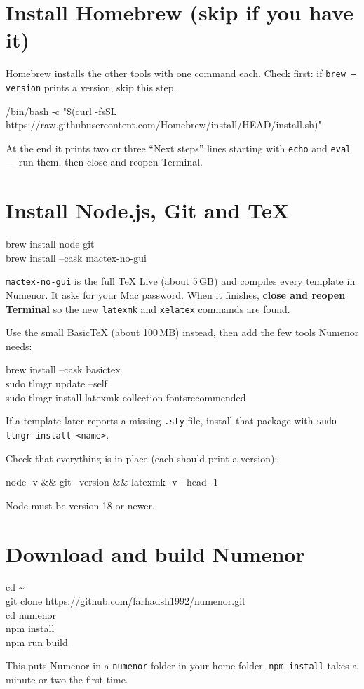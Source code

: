 \documentclass[11pt,a4paper]{article}
\begin{document}
\section{Install Homebrew (skip if you have it)}
Homebrew installs the other tools with one command each. Check first: if \texttt{brew --version} prints a version, skip this step.
\begin{term}
{\footnotesize /bin/bash -c "\$(curl -fsSL https://raw.githubusercontent.com/Homebrew/install/HEAD/install.sh)"}
\end{term}
At the end it prints two or three ``Next steps'' lines starting with \texttt{echo} and \texttt{eval} --- run them, then close and reopen Terminal.

\section{Install Node.js, Git and TeX}
\begin{term}
brew install node git\\
brew install --cask mactex-no-gui
\end{term}
\texttt{mactex-no-gui} is the full TeX Live (about 5\,GB) and compiles every template in Numenor. It asks for your Mac password.
When it finishes, \textbf{close and reopen Terminal} so the new \texttt{latexmk} and \texttt{xelatex} commands are found.

\begin{note}
Use the small BasicTeX (about 100\,MB) instead, then add the few tools Numenor needs:
\par\smallskip
\begin{tcolorbox}[colback=navy,colframe=navy,coltext=white,arc=2pt,fontupper=\ttfamily\small,left=6pt,top=3pt,bottom=3pt]
brew install --cask basictex\\
sudo tlmgr update --self\\
sudo tlmgr install latexmk collection-fontsrecommended
\end{tcolorbox}
If a template later reports a missing \texttt{.sty} file, install that package with \texttt{sudo tlmgr install <name>}.
\end{note}

Check that everything is in place (each should print a version):
\begin{term}
node -v \&\& git --version \&\& latexmk -v | head -1
\end{term}
Node must be version 18 or newer.

\section{Download and build Numenor}
\begin{term}
cd \textasciitilde\\
git clone https://github.com/farhadsh1992/numenor.git\\
cd numenor\\
npm install\\
npm run build
\end{term}
This puts Numenor in a \texttt{numenor} folder in your home folder. \texttt{npm install} takes a minute or two the first time.
\end{document}
